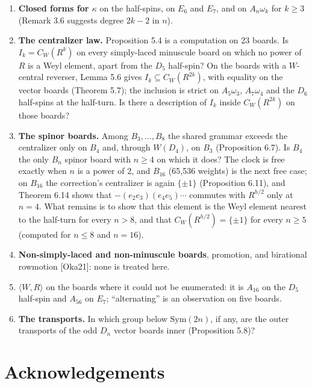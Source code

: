 \documentclass[
]{article}
\newcounter{none} %
\providecommand{\tightlist}{%
  \setlength{\itemsep}{0pt}\setlength{\parskip}{0pt}}
\begin{document}
\begin{enumerate}
\def\labelenumi{\arabic{enumi}.}
\tightlist
\item
  \textbf{Closed forms for \(\kappa\)} on the half-spins, on \(E_6\) and
  \(E_7\), and on \(A_n\omega_k\) for \(k \ge 3\) (Remark 3.6 suggests
  degree \(2k-2\) in \(n\)).
\item
  \textbf{The centralizer law.} Proposition 5.4 is a computation on 23
  boards. Is \(I_k = C_W(R^k)\) on every simply-laced minuscule board on
  which no power of \(R\) is a Weyl element, apart from the \(D_5\)
  half-spin? On the boards with a \(W\)-central reverser, Lemma 5.6
  gives \(I_k \subseteq C_W(R^{2k})\), with equality on the vector
  boards (Theorem 5.7); the inclusion is strict on \(A_5\omega_3\),
  \(A_7\omega_4\) and the \(D_6\) half-spins at the half-turn. Is there
  a description of \(I_k\) inside \(C_W(R^{2k})\) on those boards?
\item
  \textbf{The spinor boards.} Among \(B_3, \dots, B_8\) the shared
  grammar exceeds the centralizer only on \(B_4\) and, through
  \(W(D_4)\), on \(B_3\) (Proposition 6.7). Is \(B_4\) the only \(B_n\)
  spinor board with \(n \ge 4\) on which it does? The clock is free
  exactly when \(n\) is a power of 2, and \(B_{16}\) (65,536 weights) is
  the next free case; on \(B_{16}\) the correction's centralizer is
  again \(\{\pm 1\}\) (Proposition 6.11), and Theorem 6.14 shows that
  \(-(e_2e_3)(e_4e_5)\cdots\) commutes with \(R^{h/2}\) only at
  \(n = 4\). What remains is to show that this element is the Weyl
  element nearest to the half-turn for every \(n > 8\), and that
  \(C_W(R^{h/2}) = \{\pm 1\}\) for every \(n \ge 5\) (computed for
  \(n \le 8\) and \(n = 16\)).
\item
  \textbf{Non-simply-laced and non-minuscule boards}, promotion, and
  birational rowmotion {[}Oka21{]}: none is treated here.
\item
  \textbf{\(\langle W, R \rangle\)} on the boards where it could not be
  enumerated: it is \(A_{16}\) on the \(D_5\) half-spin and \(A_{56}\)
  on \(E_7\); ``alternating'' is an observation on five boards.
\item
  \textbf{The transports.} In which group below \(\mathrm{Sym}(2n)\), if
  any, are the outer transports of the odd \(D_n\) vector boards inner
  (Proposition 5.8)?
\end{enumerate}

\section{Acknowledgements}\label{acknowledgements}
\end{document}
